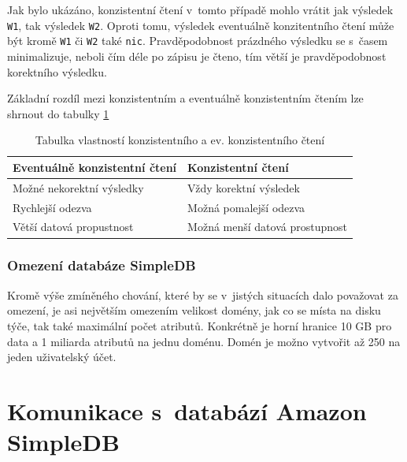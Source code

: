 \documentclass[oneside,12pt,final]{fithesis2}
\begin{document}
Jak bylo ukázáno, konzistentní čtení v~tomto případě mohlo vrátit jak výsledek \verb<W1<, tak výsledek \verb<W2<. Oproti tomu, výsledek eventuálně konzitentního čtení může být kromě \verb<W1< či \verb<W2< také \verb<nic<. Pravděpodobnost prázdného výsledku se s~časem minimalizuje, neboli čím déle po zápisu je čteno, tím větší je pravděpodobnost korektního výsledku.


Základní rozdíl mezi konzistentním a eventuálně konzistentním čtením lze shrnout do tabulky \ref{consistencyTable}
\begin{table}[h]
 \vspace{5mm}
 \begin{tabular}{l|l}
    Eventuálně konzistentní čtení & Konzistentní čtení\\ \hline
    Možné nekorektní výsledky & Vždy korektní výsledek\\ 
    Rychlejší odezva & Možná pomalejší odezva \\
    Větší datová propustnost & Možná menší datová prostupnost
 \end{tabular}
 \caption{Tabulka vlastností konzistentního a ev. konzistentního čtení}
 \label{consistencyTable}
\end{table}

\subsection{Omezení databáze SimpleDB}
Kromě výše zmíněného chování, které by se v~jistých situacích dalo považovat za omezení, je asi největším omezením velikost domény, jak co se místa na disku týče, tak také maximální počet atributů. Konkrétně je horní hranice 10 GB pro data a 1 miliarda atributů na jednu doménu. Domén je možno vytvořit až 250 na jeden uživatelský účet.


\chapter{Komunikace s~databází Amazon SimpleDB}
\end{document}
